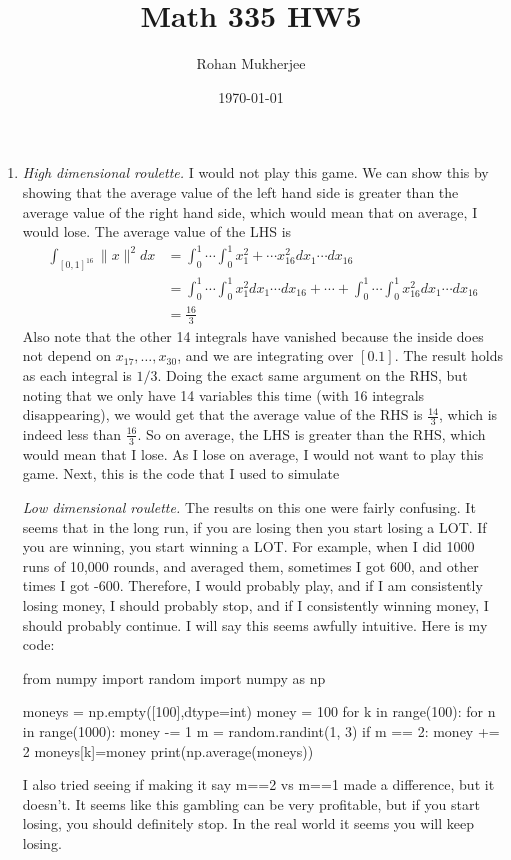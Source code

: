 \documentclass[12pt]{article}
\title{Math 335 HW5}
\date{\today}
\author{Rohan Mukherjee}
\theoremstyle{definition}
\theoremstyle{remark}
\newcommand{\mg}[1]{\| #1 \|}
\begin{document}
	\maketitle
	\begin{enumerate}[leftmargin=\labelsep]
		\item \textit{High dimensional roulette.} I would not play this game. We can show this by showing that the average value of the left hand side is greater than the average value of the right hand side, which would mean that on average, I would lose. 
		The average value of the LHS is
		\begin{align*}
			\int_{[0,1]^{16}} \mg{x}^2 dx &= \int_0^1 \cdots \int_0^1 x_1^2 + \cdots x_{16}^2 dx_1 \cdots dx_{16} \\
			&= \int_0^1 \cdots \int_0^1 x_1^2dx_1 \cdots dx_{16} + \cdots + \int_0^1 \cdots \int_0^1 x_{16}^2dx_1 \cdots dx_{16}\\ 
			&= \frac{16}3
		\end{align*}
		Also note that the other 14 integrals have vanished because the inside does not depend on $x_{17}, \ldots, x_{30}$, and we are integrating over $[0. 1]$. The result holds as each integral is $1/3$. Doing the exact same argument on the RHS, but noting that we only have 14 variables this time (with 16 integrals disappearing), we would get that the average value of the RHS is $\frac{14}3$, which is indeed less than $\frac{16}3$. So on average, the LHS is greater than the RHS, which would mean that I lose. As I lose on average, I would not want to play this game. Next, this is the code that I used to simulate 
		
		\textit{Low dimensional roulette.}
		The results on this one were fairly confusing. It seems that in the long run, if you are losing then you start losing a LOT. If you are winning, you start winning a LOT. For example, when I did 1000 runs of 10,000 rounds, and averaged them, sometimes I got 600, and other times I got -600. Therefore, I would probably play, and if I am consistently losing money, I should probably stop, and if I consistently winning money, I should probably continue. I will say this seems awfully intuitive. Here is my code:
		\begin{python}
			from numpy import random
			import numpy as np
			
			moneys = np.empty([100],dtype=int)
			money = 100
			for k in range(100):
				for n in range(1000):
					money -= 1
					m = random.randint(1, 3)
					if m == 2:
						money += 2
				moneys[k]=money
			print(np.average(moneys))
		\end{python}
		I also tried seeing if making it say m==2 vs m==1 made a difference, but it doesn't. It seems like this gambling can be very profitable, but if you start losing, you should definitely stop. In the real world it seems you will keep losing.
		

\end{enumerate}
\end{document}

